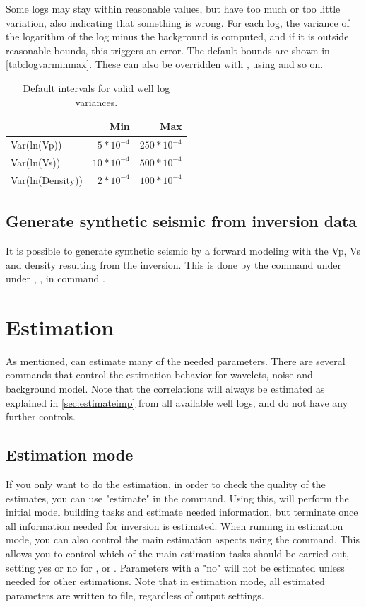 Some logs may stay within reasonable values, but have too much or too
little variation, also indicating that something is wrong. For each
log, the variance of the logarithm of the log minus the background is
computed, and if it is outside reasonable bounds, this triggers an
error. The default bounds are shown in
\autoref{tab:logvarminmax}. These can also be overridden with
, using  and so
on. 
\begin{table}
\begin{tabular}{|lrr|}
\hline
& Min & Max \\
\hline
Var(ln(Vp)) & $5*10^{-4}$ & $250*10^{-4}$ \\
Var(ln(Vs)) & $10*10^{-4}$ & $500*10^{-4}$ \\
Var(ln(Density)) & $2*10^{-4}$ & $100*10^{-4}$ \\
\hline
\end{tabular}
\caption{Default intervals for valid well log variances.\label{tab:logvarminmax}}
\end{table}

\subsection{Generate synthetic seismic from inversion data}
It is possible to generate synthetic seismic by a forward modeling
with the Vp, Vs and density resulting from the inversion. This is done
by the command   under  under
, ,  in command
. 

\section{Estimation}
\label{sec:estimateusr}
As mentioned, \crava can estimate many of the needed parameters. There
are several commands that control the estimation behavior for
wavelets, noise and background model. Note that the correlations will
always be estimated as explained in \autoref{sec:estimateimp} from all
available well logs, and do not have any further controls. 

\subsection{Estimation mode}
If you only want to do the estimation, in order to check the quality
of the estimates, you can use "estimate" in the 
command. Using this, \crava will perform the initial model building
tasks and estimate needed information, but terminate once all
information needed for inversion is estimated. When running in
estimation mode, you can also control the main estimation aspects
using the 
command. This allows you to control which of the main estimation tasks
should be carried out, setting yes or no for
,  or
. Parameters with a "no" will not be estimated
unless needed for other estimations. Note that in estimation mode, all
estimated parameters are written to file, regardless of output
settings. 
